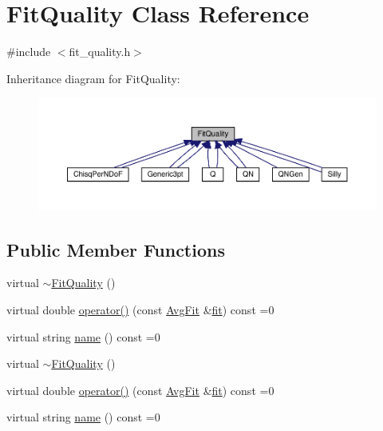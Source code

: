 \hypertarget{classFitQuality}{}\section{Fit\+Quality Class Reference}
\label{classFitQuality}


{\ttfamily \#include $<$fit\+\_\+quality.\+h$>$}



Inheritance diagram for Fit\+Quality\+:
\nopagebreak
\begin{figure}[H]
\begin{center}
\leavevmode
\includegraphics[width=350pt]{db/da0/classFitQuality__inherit__graph}
\end{center}
\end{figure}
\subsection*{Public Member Functions}
\begin{DoxyCompactItemize}
\item 
virtual \mbox{\hyperlink{classFitQuality_ae2281a610e7618f03b0c0255adb86de1}{$\sim$\+Fit\+Quality}} ()
\item 
virtual double \mbox{\hyperlink{classFitQuality_a49a49e1206709d71c3ead41e981bb848}{operator()}} (const \mbox{\hyperlink{classAvgFit}{Avg\+Fit}} \&\mbox{\hyperlink{src_2lib_2three__point__timeslice__fitting_8h_aa079c61e69a3946e3351db64a3478612}{fit}}) const =0
\item 
virtual string \mbox{\hyperlink{classFitQuality_a3423e236f25d68cf822094b363a74780}{name}} () const =0
\item 
virtual \mbox{\hyperlink{classFitQuality_ae2281a610e7618f03b0c0255adb86de1}{$\sim$\+Fit\+Quality}} ()
\item 
virtual double \mbox{\hyperlink{classFitQuality_a49a49e1206709d71c3ead41e981bb848}{operator()}} (const \mbox{\hyperlink{classAvgFit}{Avg\+Fit}} \&\mbox{\hyperlink{src_2lib_2three__point__timeslice__fitting_8h_aa079c61e69a3946e3351db64a3478612}{fit}}) const =0
\item 
virtual string \mbox{\hyperlink{classFitQuality_a3423e236f25d68cf822094b363a74780}{name}} () const =0
\end{DoxyCompactItemize}



